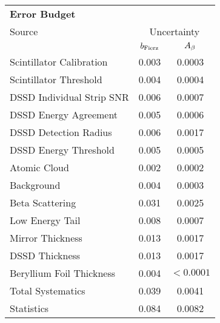 



\begin{table}[h!!!!t]
	\begin{center}
	\begin{tabular}{ l  c  c  }
		\multicolumn{3}{l}{ \textbf{Error Budget} }    \\
		\multicolumn{1}{l}{Source}	& \multicolumn{2}{c}{ \;\;\; \;\;\; Uncertainty \;\;\; \;\;\; }   
		\\
		\multicolumn{1}{l}{ } 				& \multicolumn{1}{c}{ $b_{\mathrm{Fierz}}$}   & \multicolumn{1}{c}{$A_{\beta}$}   	
		\\  \hline
		Scintillator Calibration 			& 0.003								& 0.0003											
		\\
		Scintillator Threshold  			& 0.004 							& 0.0004 						
		\\
		DSSD Individual Strip SNR \;\;\;\;& 0.006								& 0.0007													
		\\
		DSSD Energy Agreement	  			& 0.005 							& 0.0006 						
		\\
		DSSD Detection Radius	  			& 0.006 							& 0.0017 						
		\\
		DSSD Energy Threshold	  			& 0.005 							& 0.0005 						
		\\
		Atomic Cloud			  			& 0.002 							& 0.0002 						
		\\
		Background				  			& 0.004 							& 0.0003 						
		\\
		Beta Scattering				  		& 0.031 							& 0.0025 						
		\\
		Low Energy Tail				  		& 0.008 							& 0.0007 						
		\\
		Mirror Thickness				  	& 0.013 							& 0.0017 						
		\\
		DSSD Thickness				 	 	& 0.013 							& 0.0017 						
		\\
		Beryllium Foil Thickness			& 0.004								& $\!\!\!\!\!\! < 0.0001$ 			
		\\  \hline
		\multicolumn{1}{l}{ Total Systematics } & \multicolumn{1}{c}{0.039}  & \multicolumn{1}{c}{ 0.0041 }
		\\
		\multicolumn{1}{l}{ Statistics } 	   & \multicolumn{1}{c}{ 0.084 }  & \multicolumn{1}{c}{ 0.0082 }

\end{tabular}
\end{center}
\end{table}
